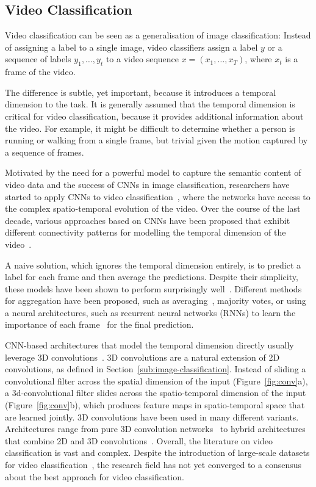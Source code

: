 \documentclass[a4paper]{article}
\begin{document}
\subsection{Video Classification}
\label{sub:video-classification}

Video classification can be seen as a generalisation of image classification:
Instead of assigning a label to a single image, video classifiers assign a label
$y$ or a sequence of labels $y_1, \ldots, y_t$ to a video sequence $x = (x_1,
\ldots, x_T)$, where $x_t$ is a frame of the video.

The difference is subtle, yet important, because it introduces a temporal
dimension to the task. It is generally assumed that the temporal dimension
is critical for video classification, because it provides additional
information about the video. For example, it might be difficult to determine
whether a person is running or walking from a single frame, but trivial given
the motion captured by a sequence of frames.

Motivated by the need for a powerful model to capture the semantic content of
video data and the success of CNNs in image classification, researchers have
started to apply CNNs to video classification~\cite{videocnn, i3d, c3d, x3d,
slowfast}, where the networks have access to the complex spatio-temporal
evolution of the video. Over the course of the last decade, various approaches
based on CNNs have been proposed that exhibit different connectivity patterns
for modelling the temporal dimension of the video~\cite{videocnn}.

A naive solution, which ignores the temporal dimension entirely, is to predict a
label for each frame and then average the predictions. Despite their simplicity,
these models have been shown to perform surprisingly well~\cite{videocnn}.
Different methods for aggregation have been proposed, such as
averaging~\cite{videocnn}, majority votes, or using a neural architectures, such
as recurrent neural networks (RNNs) to learn the importance of each
frame~\cite{lrcn} for the final prediction.

CNN-based architectures that model the temporal dimension directly usually
leverage 3D convolutions~\cite{c3d, i3d}. 3D convolutions are a natural
extension of 2D convolutions, as defined in
Section~\ref{sub:image-classification}. Instead of sliding a convolutional
filter across the spatial dimension of the input (Figure~\ref{fig:conv}a), a
3d-convolutional filter slides across the spatio-temporal dimension of the input
(Figure~\ref{fig:conv}b), which produces feature maps in spatio-temporal space
that are learned jointly. 3D convolutions have been used in many different
variants. Architectures range from pure 3D convolution networks~\cite{i3d, c3d}
to hybrid architectures that combine 2D and 3D convolutions~\cite{x3d,
slowfast}. Overall, the literature on video classification is vast and complex.
Despite the introduction of large-scale datasets for video
classification~\cite{kinetics}, the research field has not yet converged to a
consensus about the best approach for video classification.
\end{document}
